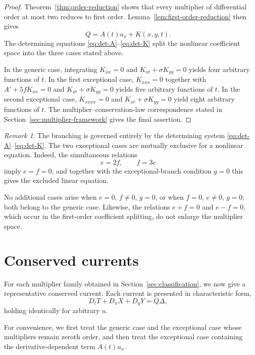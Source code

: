 \documentclass[11pt]{article}
\numberwithin{equation}{section}
\theoremstyle{definition}
\theoremstyle{remark}
\newtheorem{remark}[theorem]{Remark}
\begin{document}
\begin{proof}

Theorem~\ref{thm:order-reduction} shows that every multiplier
of differential order at most two reduces to first order.
Lemma~\ref{lem:first-order-reduction} then gives
\begin{equation*}
Q=A(t)u_x+K(x,y,t).
\end{equation*}
The determining equations \eqref{eq:det-A}--\eqref{eq:det-K} split
the nonlinear coefficient space into the three cases stated above.

In the generic case, integrating $K_{xx}=0$ and
$K_{xt}+\sigma K_{yy}=0$ yields four arbitrary functions of $t$.
In the first exceptional case, $K_{xxx}=0$ together with
$A'+5fK_{xx}=0$ and $K_{xt}+\sigma K_{yy}=0$ yields five arbitrary
functions of $t$. In the second exceptional case, $K_{xxxx}=0$ and
$K_{xt}+\sigma K_{yy}=0$ yield eight arbitrary functions of $t$.
The multiplier--conservation-law correspondence stated in
Section~\ref{sec:multiplier-framework} gives the final assertion.

\end{proof}
\begin{remark}
The branching is governed entirely by the determining system
\eqref{eq:det-A}--\eqref{eq:det-K}. The two exceptional cases are
mutually exclusive for a nonlinear equation. Indeed, the simultaneous
relations
\[
e=2f,
\qquad
f=3e
\]
imply $e=f=0$, and together with the exceptional-branch condition
$g=0$ this gives the excluded linear equation.

No additional cases arise when $e=0$, $f\neq0$, $g=0$, or when
$f=0$, $e\neq0$, $g=0$; both belong to the generic case. Likewise,
the relations $e+f=0$ and $e-f=0$, which occur in the first-order
coefficient splitting, do not enlarge the multiplier space.
\end{remark}
\section{Conserved currents}
\label{sec:conserved-currents}

For each multiplier family obtained in
Section~\ref{sec:classification}, we now give a representative
conserved current. Each current is presented in characteristic form,
\[
D_tT+D_xX+D_yY=Q\Delta,
\]
holding identically for arbitrary $u$.

For convenience, we first treat the generic case and the exceptional
case whose multipliers remain zeroth order, and then treat the
exceptional case containing the derivative-dependent term
$A(t)u_x$.
\end{document}
